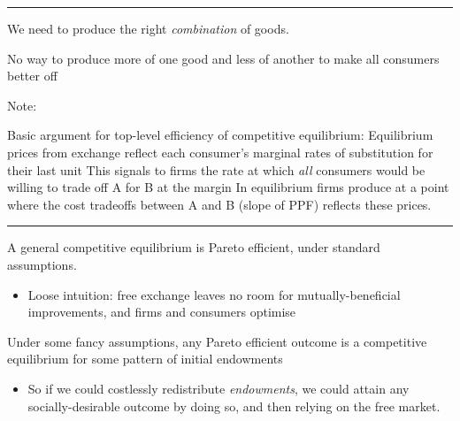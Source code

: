 \documentclass[]{article}
\providecommand{\tightlist}{%
  \setlength{\itemsep}{0pt}\setlength{\parskip}{0pt}}
\begin{document}
\begin{center}\rule{0.5\linewidth}{\linethickness}\end{center}

We need to produce the right \emph{combination} of goods.

\bigskip
\bigskip

\begin{description}
\tightlist
\item[Efficient allocation of resources (`top-level' condition)]
No way to produce more of one good and less of another to make all
consumers better off
\end{description}

Note:

Basic argument for top-level efficiency of competitive equilibrium:
Equilibrium prices from exchange reflect each consumer's marginal rates
of substitution for their last unit This signals to firms the rate at
which \emph{all} consumers would be willing to trade off A for B at the
margin In equilibrium firms produce at a point where the cost tradeoffs
between A and B (slope of PPF) reflects these prices.

\begin{center}\rule{0.5\linewidth}{\linethickness}\end{center}

\begin{description}
\tightlist
\item[First fundamental theorem of welfare economics]
A general competitive equilibrium is Pareto efficient, under standard
assumptions.
\end{description}

\begin{itemize}
\tightlist
\item
  Loose intuition: free exchange leaves no room for mutually-beneficial
  improvements, and firms and consumers optimise
\end{itemize}

\begin{description}
\tightlist
\item[Second fundamental theorem]
Under some fancy assumptions, any Pareto efficient outcome is a
competitive equilibrium for some pattern of initial endowments
\end{description}

\begin{itemize}
\tightlist
\item
  So if we could costlessly redistribute \emph{endowments}, we could
  attain any socially-desirable outcome by doing so, and then relying on
  the free market.
\end{itemize}
\end{document}

